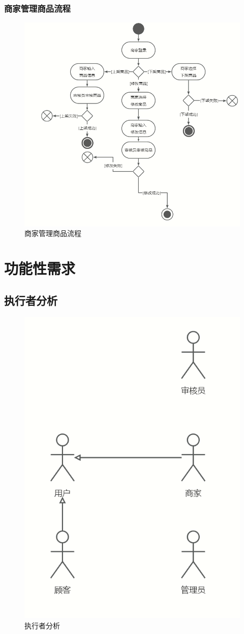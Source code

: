 \subsubsection{商家管理商品流程}
\begin{figure}[H]
    \centering
    \includegraphics[width=0.6\linewidth]{pics/7.png}
    \caption{商家管理商品流程}
    \label{fig:sjglsplc}
\end{figure}

\section{功能性需求}
\subsection{执行者分析}
\begin{figure}[H]
    \centering
    \includegraphics[width=0.4\linewidth]{pics/8.png}
    \caption{执行者分析}
    \label{fig:zxzfx}
\end{figure}


